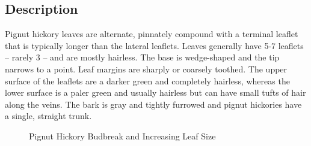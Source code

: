 \documentclass{article}\usepackage[]{graphicx}\usepackage[]{color}
\begin{document}
\subsection*{Description}
Pignut hickory leaves are alternate, pinnately compound with a terminal leaflet that is typically longer than the lateral leaflets. Leaves generally have 5-7 leaflets -- rarely 3 -- and are mostly hairless. The base is wedge-shaped and the tip narrows to a point. Leaf margins are sharply or coarsely toothed. The upper surface of the leaflets are a darker green and completely hairless, whereas the lower surface is a paler green and usually hairless but can have small tufts of hair along the veins. The bark is gray and tightly furrowed and pignut hickories have a single, straight trunk. 
\begin{figure}[ht]%
    \centering
    \qquad
    \caption{Pignut Hickory Budbreak and Increasing Leaf Size}%
    \label{fig:leaves}%
\end{figure}
\newpage
\end{document}
